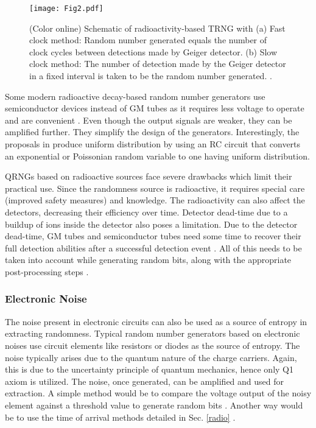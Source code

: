 \documentclass[]{interact}
\theoremstyle{plain}%
\theoremstyle{definition}
\theoremstyle{remark}
\begin{document}
\begin{figure}[tb]
    \texttt{[image: Fig2.pdf]}
    \caption{(Color online) Schematic of radioactivity-based TRNG with (a) Fast clock method: Random number generated equals the number of clock cycles between detections made by Geiger detector. \cite{herrero2017quantum}  (b) Slow clock method: The number of detection made by the Geiger detector in a fixed interval is taken to be the random number generated. \cite{herrero2017quantum}.} 
    \label{fig2}
    \end{figure}

Some modern radioactive decay-based random number generators use semiconductor devices instead of GM tubes as it requires less voltage to operate and are convenient \cite{alkassar2005obtaining,duggirala2010radioisotope}. Even though the output signals are weaker, they can be amplified further. They simplify the design of the generators. Interestingly, the proposals in \cite{duggirala2010radioisotope} produce uniform distribution by using an RC circuit that converts an exponential or Poissonian random variable to one having uniform distribution.

QRNGs based on radioactive sources face severe drawbacks which limit their practical use. Since the randomness source is radioactive, it requires special care (improved safety measures) and knowledge. The radioactivity can also affect the detectors, decreasing their efficiency over time. Detector dead-time due to a buildup of ions inside the detector also poses a limitation. Due to the detector dead-time, GM tubes and semiconductor tubes need some time to recover their full detection abilities after a successful detection event \cite{1698087}. All of this needs to be taken into account while generating random bits, along with the appropriate post-processing steps \cite{Vincent_1971}. 

\subsubsection{Electronic Noise}
The noise present in electronic circuits can also be used as a source of entropy in extracting randomness. Typical random number generators based on electronic noises use circuit elements like resistors or diodes as the source of entropy. The noise typically arises due to the quantum nature of the charge carriers. Again, this is due to the uncertainty principle of quantum mechanics, hence only Q1 axiom is utilized. The noise, once generated, can be amplified and used for extraction. A simple method would be to compare the voltage output of the noisy element against a threshold value to generate random bits \cite{Vincent_1970,Gude+1985+187+190}. Another way would be to use the time of arrival methods detailed in Sec. \ref{radio}  \cite{586025,847868}. 
\end{document}
